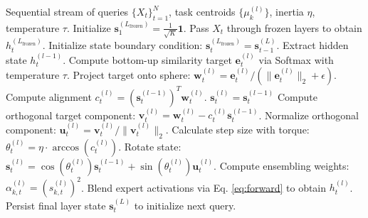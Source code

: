 \begin{algorithm}[t]
\caption{Unitary Geodesic Routing (UGR)}
\label{alg:ugr}
\begin{algorithmic}[1]
\REQUIRE Sequential stream of queries $\{X_t\}_{t=1}^N$, task centroids $\{\mu_k^{(l)}\}$, inertia $\eta$, temperature $\tau$.
\STATE Initialize $\mathbf{s}_1^{(L_{\text{frozen}})} = \frac{1}{\sqrt{K}} \mathbf{1}$.
    \STATE Pass $X_t$ through frozen layers to obtain $h_t^{(L_{\text{frozen}})}$.
        \STATE Initialize state boundary condition: $\mathbf{s}_t^{(L_{\text{frozen}})} = \mathbf{s}_{t-1}^{(L)}$.
    \ENDIF
        \STATE Extract hidden state $h_t^{(l-1)}$.
        \STATE Compute bottom-up similarity target $\mathbf{e}_t^{(l)}$ via Softmax with temperature $\tau$.
        \STATE Project target onto sphere: $\mathbf{w}_t^{(l)} = \mathbf{e}_t^{(l)} / (\|\mathbf{e}_t^{(l)}\|_2 + \epsilon)$.
        \STATE Compute alignment $c_t^{(l)} = \left(\mathbf{s}_t^{(l-1)}\right)^T \mathbf{w}_t^{(l)}$.
            \STATE $\mathbf{s}_t^{(l)} = \mathbf{s}_t^{(l-1)}$
        \ELSE
            \STATE Compute orthogonal target component: $\mathbf{v}_t^{(l)} = \mathbf{w}_t^{(l)} - c_t^{(l)} \mathbf{s}_t^{(l-1)}$.
            \STATE Normalize orthogonal component: $\mathbf{u}_t^{(l)} = \mathbf{v}_t^{(l)} / \|\mathbf{v}_t^{(l)}\|_2$.
            \STATE Calculate step size with torque: $\theta_t^{(l)} = \eta \cdot \arccos\left(c_t^{(l)}\right)$.
            \STATE Rotate state: $\mathbf{s}_t^{(l)} = \cos\left(\theta_t^{(l)}\right) \mathbf{s}_t^{(l-1)} + \sin\left(\theta_t^{(l)}\right) \mathbf{u}_t^{(l)}$.
        \ENDIF
        \STATE Compute ensembling weights: $\alpha_{k, t}^{(l)} = \left(s_{k, t}^{(l)}\right)^2$.
        \STATE Blend expert activations via Eq. \eqref{eq:forward} to obtain $h_t^{(l)}$.
    \ENDFOR
    \STATE Persist final layer state $\mathbf{s}_t^{(L)}$ to initialize next query.
\ENDFOR
\end{algorithmic}
\end{algorithm}
